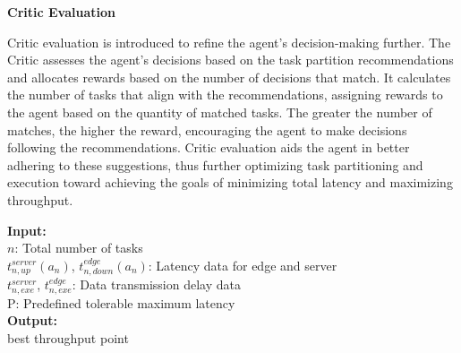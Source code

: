 \documentclass[preprint,12pt,authoryear]{elsarticle}
\begin{document}
\textbf{Critic Evaluation}

Critic evaluation is introduced to refine the agent's decision-making further. The Critic assesses the agent's decisions based on the task partition recommendations and allocates rewards based on the number of decisions that match. It calculates the number of tasks that align with the recommendations, assigning rewards to the agent based on the quantity of matched tasks. The greater the number of matches, the higher the reward, encouraging the agent to make decisions following the recommendations. Critic evaluation aids the agent in better adhering to these suggestions, thus further optimizing task partitioning and execution toward achieving the goals of minimizing total latency and maximizing throughput.

\begin{algorithm}[H]
\caption{Critic Evaluation via Partition Function}
\textbf{Input:}\\
    $n$: Total number of tasks\\
    $t_{n,up}^{server}(a_n)$, $t_{n,down}^{edge}(a_n)$: Latency data for edge and server\\
    $t_{n,exe}^{server}$, $t_{n,exe}^{edge}$: Data transmission delay data\\
    P: Predefined tolerable maximum latency\\
\textbf{Output:}\\
    best throughput point\\
\end{algorithm}
\end{document}
